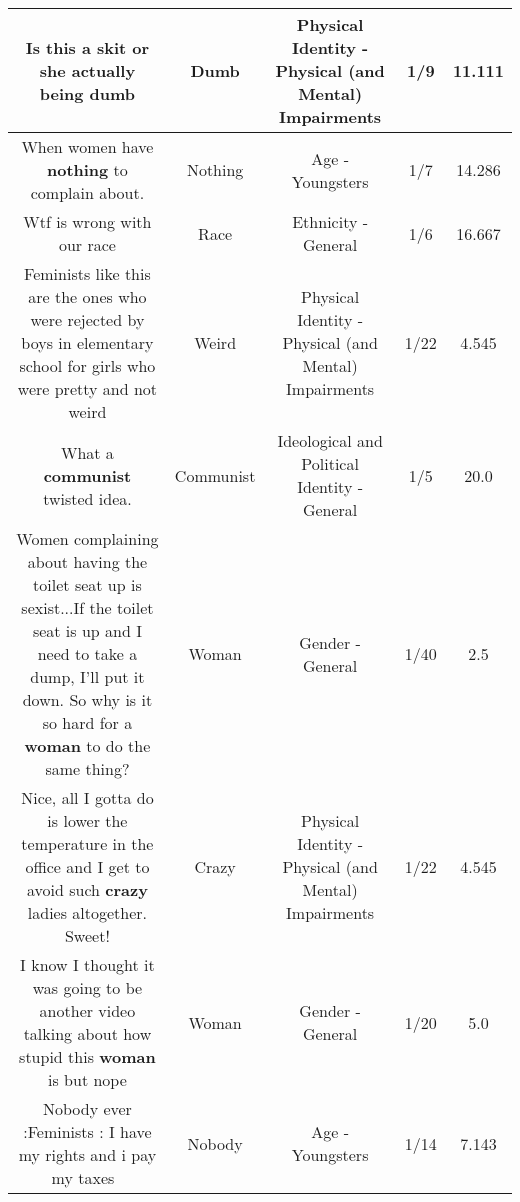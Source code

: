 \documentclass[11pt]{article}
\newlength\mylength
\begin{document}
\begin{center}
\begin{longtable}{|C{.65\mylength}|C{.30\mylength}|C{.12\mylength}|C{.12\mylength}|C{.12\mylength}|}
  \small Is this a skit or she actually being dumb\normalsize   & Dumb & Physical Identity - Physical (and Mental) Impairments & 1/9 & 11.111 \\  \hline
  \small When women have \textbf{nothing} to complain about.\normalsize   & Nothing & Age - Youngsters & 1/7 & 14.286 \\  \hline
  \small Wtf is wrong with our race\normalsize   & Race & Ethnicity - General & 1/6 & 16.667 \\  \hline
  \small Feminists like this are the ones who were rejected by boys in elementary school for girls who were pretty and not weird\normalsize   & Weird & Physical Identity - Physical (and Mental) Impairments & 1/22 & 4.545 \\  \hline
  \small What a \textbf{communist} twisted idea.\normalsize   & Communist &  Ideological and Political Identity - General & 1/5 & 20.0 \\  \hline
  \small Women complaining about having the toilet seat up is sexist...If the toilet seat is up and I need to take a dump, I'll put it down. So why is it so hard for a \textbf{woman} to do the same thing?\normalsize   & Woman & Gender - General & 1/40 & 2.5 \\  \hline
  \small Nice, all I gotta do is lower the temperature in the office and I get to avoid such \textbf{crazy} ladies altogether. Sweet!\normalsize   & Crazy & Physical Identity - Physical (and Mental) Impairments & 1/22 & 4.545 \\  \hline
  \small I know I thought it was going to be another video talking about how stupid this \textbf{woman} is but nope\normalsize   & Woman & Gender - General & 1/20 & 5.0 \\  \hline
  \small Nobody ever :Feminists : I have my rights and i pay my taxes😬😬\normalsize   & Nobody & Age - Youngsters & 1/14 & 7.143 \\  \hline

\end{longtable}
\end{center}
\end{document}
